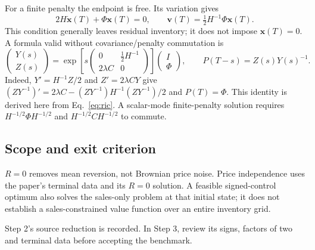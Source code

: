 For a finite penalty the endpoint is free. Its variation gives
\[
 2H\dot{\mathbf x}(T)+\Phi\mathbf x(T)=0,
 \qquad\mathbf v(T)=\tfrac12H^{-1}\Phi\mathbf x(T).
\]
This condition generally leaves residual inventory; it does not impose
$\mathbf x(T)=0$. A formula valid without covariance/penalty commutation is
\begin{equation}
 \begin{pmatrix}Y(s)\\Z(s)\end{pmatrix}
 =\exp\!\left[s\begin{pmatrix}0&\tfrac12H^{-1}\\2\lambda C&0\end{pmatrix}\right]
 \begin{pmatrix}I\\\Phi\end{pmatrix},\qquad P(T-s)=Z(s)Y(s)^{-1}.
 \label{eq:finite-penalty}
\end{equation}
Indeed, $Y'=H^{-1}Z/2$ and $Z'=2\lambda CY$ give
$(ZY^{-1})'=2\lambda C-(ZY^{-1})H^{-1}(ZY^{-1})/2$ and $P(T)=\Phi$.
This identity is derived here from Eq.~\eqref{eq:ric}. A scalar-mode
finite-penalty solution requires $H^{-1/2}\Phi H^{-1/2}$ and
$H^{-1/2}CH^{-1/2}$ to commute.

\subsection*{Scope and exit criterion}

$R=0$ removes mean reversion, not Brownian price noise. Price independence
uses the paper's terminal data and its $R=0$ solution. A feasible signed-control
optimum also solves the sales-only problem at that initial state; it does
not establish a sales-constrained value function over an entire inventory grid.

Step 2's source reduction is recorded. In Step 3, review its signs, factors
of two and terminal data before accepting the benchmark.

